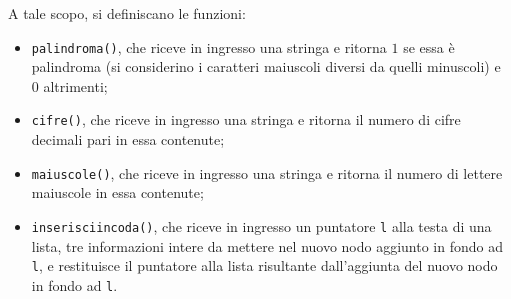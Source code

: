 \documentclass[12pt]{article}
\begin{document}
A tale scopo, si definiscano le funzioni:
%
\begin{itemize}
\item \texttt{palindroma()}, che riceve in ingresso una stringa e ritorna $1$
  se essa \`e palindroma (si considerino i caratteri maiuscoli diversi da quelli minuscoli)
  e $0$ altrimenti;
\item \texttt{cifre()}, che riceve in ingresso una stringa e ritorna il numero di
  cifre decimali pari in essa contenute;
\item \texttt{maiuscole()}, che riceve in ingresso una stringa e ritorna il numero di
  lettere maiuscole in essa contenute;
\item \texttt{inserisciincoda()}, che riceve in ingresso un puntatore \texttt{l}
  alla testa di una lista,
  tre informazioni intere da mettere nel nuovo nodo aggiunto in fondo ad \texttt{l},
  e restituisce il puntatore alla lista risultante dall'aggiunta del nuovo nodo
  in fondo ad \texttt{l}.
\end{itemize}
\end{document}
